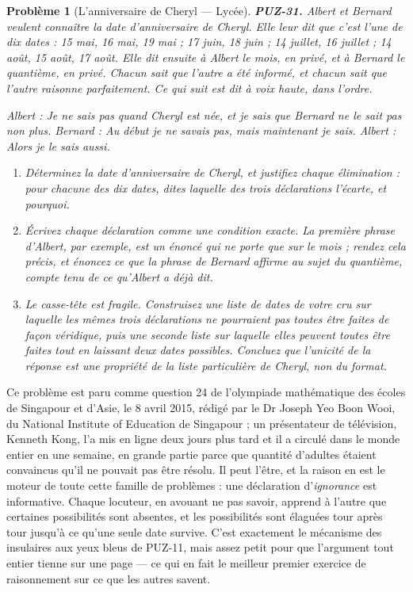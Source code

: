\documentclass[11pt]{article}
\newtheorem{problem}{Problème}
\begin{document}
\bigskip

\begin{problem}[{L'anniversaire de Cheryl --- Lycée}]
\textbf{PUZ-31.} Albert et Bernard veulent connaître la date d'anniversaire de Cheryl.
Elle leur dit que c'est l'une de dix dates : 15 mai, 16 mai, 19 mai ; 17 juin, 18 juin ;
14 juillet, 16 juillet ; 14 août, 15 août, 17 août. Elle dit ensuite à Albert le mois, en
privé, et à Bernard le quantième, en privé. Chacun sait que l'autre a été informé, et
chacun sait que l'autre raisonne parfaitement. Ce qui suit est dit à voix haute, dans
l'ordre.

\noindent Albert : \og{} Je ne sais pas quand Cheryl est née, et je sais que Bernard ne le sait pas
non plus. \fg{} Bernard : \og{} Au début je ne savais pas, mais maintenant je sais. \fg{} Albert :
\og{} Alors je le sais aussi. \fg{}
\begin{enumerate}
\item[(a)] Déterminez la date d'anniversaire de Cheryl, et justifiez chaque élimination : pour
chacune des dix dates, dites laquelle des trois déclarations l'écarte, et pourquoi.
\item[(b)] Écrivez chaque déclaration comme une condition exacte. La première phrase d'Albert,
par exemple, est un énoncé qui ne porte que sur le mois ; rendez cela précis, et énoncez
ce que la phrase de Bernard affirme au sujet du quantième, compte tenu de ce qu'Albert a
déjà dit.
\item[(c)] Le casse-tête est fragile. Construisez une liste de dates de votre cru sur laquelle
les mêmes trois déclarations ne pourraient pas toutes être faites de façon véridique, puis
une seconde liste sur laquelle elles peuvent toutes être faites tout en laissant deux dates
possibles. Concluez que l'unicité de la réponse est une propriété de la liste particulière
de Cheryl, non du format.
\end{enumerate}

\end{problem}

\noindent Ce problème est paru comme question 24 de l'olympiade mathématique des
écoles de Singapour et d'Asie, le 8 avril 2015, rédigé par le Dr Joseph Yeo Boon Wooi, du
National Institute of Education de Singapour ; un présentateur de télévision, Kenneth Kong,
l'a mis en ligne deux jours plus tard et il a circulé dans le monde entier en une semaine,
en grande partie parce que quantité d'adultes étaient convaincus qu'il ne pouvait pas être
résolu. Il peut l'être, et la raison en est le moteur de toute cette famille de problèmes :
une déclaration d'\textit{ignorance} est informative. Chaque locuteur, en avouant ne pas
savoir, apprend à l'autre que certaines possibilités sont absentes, et les possibilités
sont élaguées tour après tour jusqu'à ce qu'une seule date survive. C'est exactement le
mécanisme des insulaires aux yeux bleus de PUZ-11, mais assez petit pour que l'argument
tout entier tienne sur une page --- ce qui en fait le meilleur premier exercice de
raisonnement sur ce que les autres savent.
\end{document}

